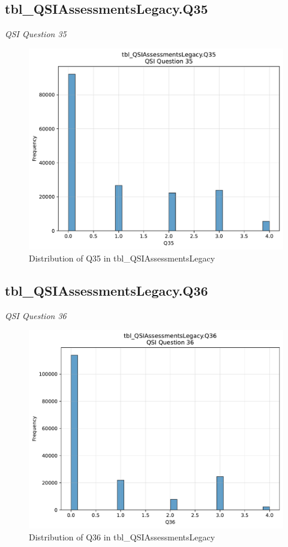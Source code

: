 \subsection{tbl\_QSIAssessmentsLegacy.Q35}
\textit{QSI Question 35}

\begin{figure}[htbp]
\centering
\includegraphics[width=\textwidth]{figures/dbo_tbl_QSIAssessmentsLegacy_Q35.pdf}
\caption{Distribution of Q35 in tbl\_QSIAssessmentsLegacy}
\end{figure}\newpage

\subsection{tbl\_QSIAssessmentsLegacy.Q36}
\textit{QSI Question 36}

\begin{figure}[htbp]
\centering
\includegraphics[width=\textwidth]{figures/dbo_tbl_QSIAssessmentsLegacy_Q36.pdf}
\caption{Distribution of Q36 in tbl\_QSIAssessmentsLegacy}
\end{figure}\newpage

